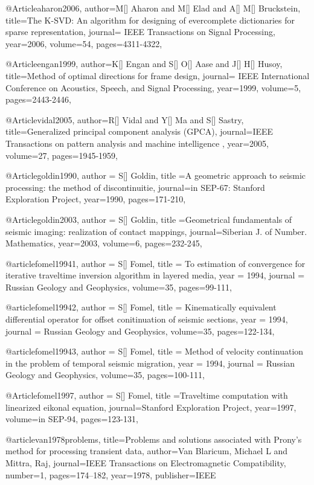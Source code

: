 @Article{aharon2006,
  author={M[] Aharon and M[] Elad and A[] M[] Bruckstein},
  title={The {K}-{SVD}: An algorithm for designing of evercomplete dictionaries for sparse representation},
  journal={ IEEE Transactions on Signal Processing},
  year=2006,
  volume=54,
  pages={4311-4322},
}

@Article{engan1999,
  author={K[] Engan and S[] O[] Aase and J[] H[] Husoy},
  title={Method of optimal directions for frame design},
  journal={ IEEE International Conference on Acoustics, Speech, and Signal Processing},
  year=1999,
  volume=5,
  pages={2443-2446},
}

@Article{vidal2005,
  author={R[] Vidal and Y[] Ma and S[] Sastry},
  title={Generalized principal component analysis (GPCA)},
  journal={IEEE Transactions on pattern analysis and machine intelligence
},
  year=2005,
  volume=27,
  pages={1945-1959},
}

@Article{goldin1990,
  author = {S[] Goldin},
  title ={A geometric approach to seismic processing: the method of discontinuitie},
  journal={in SEP-67: Stanford Exploration Project},
  year=1990,
  pages={171-210},
}

@Article{goldin2003,
  author = {S[] Goldin},
  title ={Geometrical fundamentals of seismic imaging: realization of contact mappings},
  journal={Siberian J. of Number. Mathematics},
  year=2003,
  volume=6,
  pages={232-245},
}

@article{fomel19941,
  author =	 {S[] Fomel},
  title =	 {To estimation of convergence for iterative traveltime inversion algorithm in layered media},
  year =	 1994,
  journal =	 {Russian Geology and Geophysics},
  volume={35},
 pages=99-111,
}

@article{fomel19942,
  author =	 {S[] Fomel},
  title =	 {Kinematically equivalent differential operator for offset conitinuation of seismic sections},
  year =	 1994,
  journal =	 {Russian Geology and Geophysics},
  volume={35},
 pages=122-134,
}

@article{fomel19943,
  author =	 {S[] Fomel},
  title =	 {Method of velocity continuation in the problem of temporal seismic migration},
  year =	 1994,
  journal =	 {Russian Geology and Geophysics},
  volume={35},
 pages=100-111,
}

@Article{fomel1997,
  author = {S[] Fomel},
  title ={Traveltime computation with linearized eikonal equation},
  journal={Stanford Exploration Project},
  year=1997,
  volume={in SEP-94},
  pages={123-131},
}

@article{van1978problems,
  title={Problems and solutions associated with Prony's method for processing transient data},
  author={Van Blaricum, Michael L and Mittra, Raj},
  journal={IEEE Transactions on Electromagnetic Compatibility},
  number={1},
  pages={174--182},
  year={1978},
  publisher={IEEE}
}


